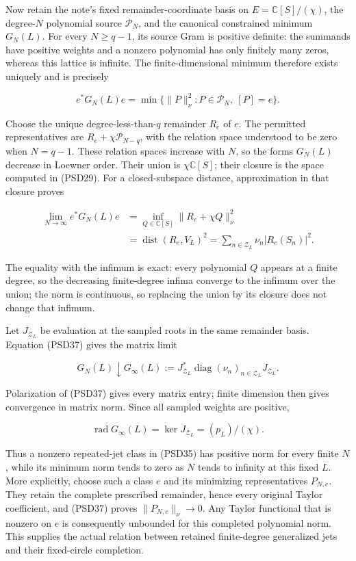 Now retain the note's fixed remainder-coordinate basis on \(E=\mathbb C[S]/(\chi)\), the degree-\(N\) polynomial source \(\mathcal P_N\), and the canonical constrained minimum \(G_N(L)\). For every \(N\ge q-1\), its source Gram is positive definite: the summands have positive weights and a nonzero polynomial has only finitely many zeros, whereas this lattice is infinite. The finite-dimensional minimum therefore exists uniquely and is precisely

\[
e^*G_N(L)e=
\min\{\|P\|_\nu^2:P\in\mathcal P_N,\ [P]=e\}.
\tag{PSD36}
\]

Choose the unique degree-less-than-\(q\) remainder \(R_e\) of \(e\). The permitted representatives are \(R_e+\chi\mathcal P_{N-q}\), with the relation space understood to be zero when \(N=q-1\). These relation spaces increase with \(N\), so the forms \(G_N(L)\) decrease in Loewner order. Their union is \(\chi \mathbb C[S]\); their closure is the space computed in (PSD29). For a closed-subspace distance, approximation in that closure proves

\[
\begin{aligned}
\lim_{N\to\infty}e^*G_N(L)e
&=\inf_{Q\in\mathbb C[S]}\|R_e+\chi Q\|_\nu^2\\
&=\operatorname{dist}(R_e,V_L)^2
=\sum_{n\in\mathcal Z_L}\nu_n|R_e(S_n)|^2.
\end{aligned}
\tag{PSD37}
\]

The equality with the infimum is exact: every polynomial \(Q\) appears at a finite degree, so the decreasing finite-degree infima converge to the infimum over the union; the norm is continuous, so replacing the union by its closure does not change that infimum.

Let \(J_{\mathcal Z_L}\) be evaluation at the sampled roots in the same remainder basis. Equation (PSD37) gives the matrix limit

\[
G_N(L)\downarrow
G_\infty(L):=J_{\mathcal Z_L}^*
\operatorname{diag}(\nu_n)_{n\in\mathcal Z_L}J_{\mathcal Z_L}.
\tag{PSD38}
\]

Polarization of (PSD37) gives every matrix entry; finite dimension then gives convergence in matrix norm. Since all sampled weights are positive,

\[
\operatorname{rad}G_\infty(L)=\ker J_{\mathcal Z_L}
=(p_L)/(\chi).
\tag{PSD39}
\]

Thus a nonzero repeated-jet class in (PSD35) has positive norm for every finite \(N\), while its minimum norm tends to zero as \(N\) tends to infinity at this fixed \(L\). More explicitly, choose such a class \(e\) and its minimizing representatives \(P_{N,e}\). They retain the complete prescribed remainder, hence every original Taylor coefficient, and (PSD37) proves \(\|P_{N,e}\|_\nu\longrightarrow0\). Any Taylor functional that is nonzero on \(e\) is consequently unbounded for this completed polynomial norm. This supplies the actual relation between retained finite-degree generalized jets and their fixed-circle completion.

